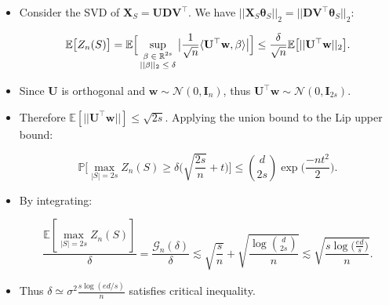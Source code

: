 \documentclass[11pt]{beamer}
\newcommand{\Prob}{\mathbb{P}}
\newcommand{\E}{\mathbb{E}}
\newcommand{\cG}{\mathcal{G}}
\begin{document}
	\begin{frame}
		\begin{itemize}
			\item Consider the SVD of $\mathbf{X}_S = \mathbf{U}\mathbf{D}\mathbf{V}^\top$. We have $||\mathbf{X}_S\boldsymbol{\theta}_S||_2 = ||\mathbf{D}\mathbf{V}^\top\boldsymbol{\theta}_S||_2$:
			\begin{small}
				\begin{equation*}
					\E\big[Z_n(S)\big] = \E \Big[\sup_{
					\begin{scriptsize}
					\begin{matrix}
					\beta \in \mathbb{R}^{2s}\\
					||\beta||_2 \leq \delta
					\end{matrix}					
					\end{scriptsize}						
				} \big|\frac{1}{\sqrt{n}} \langle \mathbf{U}^\top \mathbf{w}, \beta\rangle\big|\Big] \leq \frac{\delta}{\sqrt{n}} \E\big[||\mathbf{U}^\top \mathbf{w}||_2\big].
				\end{equation*}
			\end{small}
		\item Since $\mathbf{U}$ is orthogonal and $\mathbf{w}\sim \mathcal{N}(0, \mathbf{I}_{n})$, thus $\mathbf{U}^\top\mathbf{w}\sim \mathcal{N}(0, \mathbf{I}_{2s})$.
		
		\item Therefore $\E[||\mathbf{U}^\top\mathbf{w}||] \leq \sqrt{2s}$. Applying the union bound to the Lip upper bound:
		\begin{small}
			\begin{equation*}
				\Prob\Big[\max_{|S|=2s} Z_n(S) \geq \delta\Big(\sqrt{\frac{2s}{n}} + t\Big)\Big] \leq {d \choose 2s} \exp\Big(\frac{-nt^2}{2}\Big).
			\end{equation*}
		\end{small}
		\item By integrating:
		\begin{small}
			\begin{equation*}
				\frac{\E[\max_{|S|=2s} Z_n(S)]}{\delta} = \frac{\cG_n(\delta)}{\delta} \lesssim \sqrt{\frac{s}{n}} + \sqrt{\frac{\log{d \choose 2s}}{n}} \lesssim \sqrt{\frac{s\log\big(\frac{ed}{s}\big)}{n}}.
			\end{equation*}
		\end{small}
		\item Thus $\delta \simeq \sigma^2 \frac{s\log(ed/s)}{n}$ satisfies critical inequality.
		\end{itemize}
	\end{frame}
	
\end{document}
